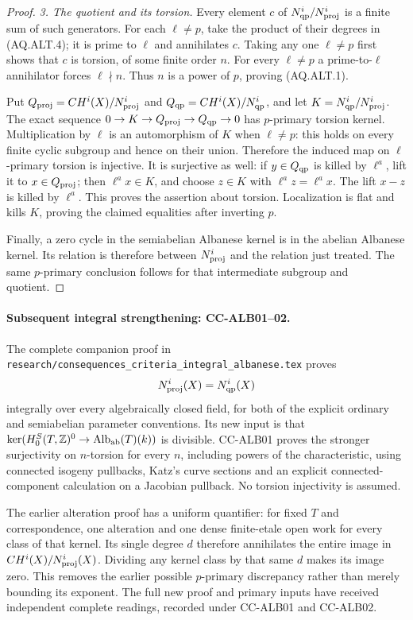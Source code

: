 \begin{proof}
\emph{3. The quotient and its torsion.}
Every element $c$ of $N^i_{\rm qp}/N^i_{\rm proj}$
is a finite sum of such generators.  For each
$\ell\ne p$, take the product of their degrees in
(AQ.ALT.4); it is prime to $\ell$ and annihilates $c$.
Taking any one $\ell\ne p$ first shows that $c$ is
torsion, of some finite order $n$.  For every
$\ell\ne p$ a prime-to-$\ell$ annihilator forces
$\ell\nmid n$.  Thus $n$ is a power of $p$, proving
(AQ.ALT.1).

Put $Q_{\rm proj}=CH^i(X)/N^i_{\rm proj}$ and
$Q_{\rm qp}=CH^i(X)/N^i_{\rm qp}$, and let
$K=N^i_{\rm qp}/N^i_{\rm proj}$.
The exact sequence
$0\to K\to Q_{\rm proj}\to Q_{\rm qp}\to0$
has $p$-primary torsion kernel.  Multiplication by
$\ell$ is an automorphism of $K$ when $\ell\ne p$:
this holds on every finite cyclic subgroup and hence
on their union.  Therefore the induced map on
$\ell$-primary torsion is injective.  It is surjective
as well: if $y\in Q_{\rm qp}$ is killed by
$\ell^a$, lift it to $x\in Q_{\rm proj}$;
then $\ell^a x\in K$, and choose $z\in K$ with
$\ell^a z=\ell^a x$.  The lift $x-z$ is killed by
$\ell^a$.  This proves the assertion about torsion.
Localization is flat and kills $K$, proving the
claimed equalities after inverting $p$.

Finally, a zero cycle in the semiabelian Albanese
kernel is in the abelian Albanese kernel.  Its relation
is therefore between $N^i_{\rm proj}$ and the relation
just treated.  The same $p$-primary conclusion follows
for that intermediate subgroup and quotient.
\end{proof}

\paragraph{Subsequent integral strengthening: CC-ALB01--02.}
The complete companion proof in
\texttt{research/consequences\_criteria\_integral\_albanese.tex}
proves
\[
                  N^i_{\rm proj}(X)=N^i_{\rm qp}(X)
\]
integrally over every algebraically closed field, for both
of the explicit ordinary and semiabelian parameter conventions.
Its new input is that
$\ker(H^S_0(T,\mathbb Z)^0\to\operatorname{Alb}_{\rm ab}(T)(k))$
is divisible.  CC-ALB01 proves the stronger surjectivity on
$n$-torsion for every $n$, including powers of the characteristic,
using connected isogeny pullbacks, Katz's curve sections and an
explicit connected-component calculation on a Jacobian pullback.
No torsion injectivity is assumed.

The earlier alteration proof has a uniform quantifier:
for fixed $T$ and correspondence, one alteration and one dense
finite-etale open work for every class of that kernel.  Its
single degree $d$ therefore annihilates the entire image in
$CH^i(X)/N^i_{\rm proj}(X)$.  Dividing any kernel class by
that same $d$ makes its image zero.  This removes the earlier
possible $p$-primary discrepancy rather than merely bounding
its exponent.  The full new proof and primary inputs have
received independent complete readings, recorded under
CC-ALB01 and CC-ALB02.

